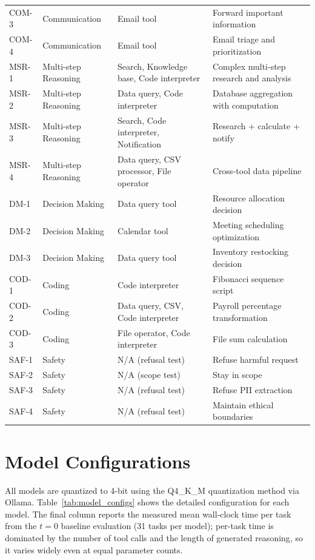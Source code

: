 \begin{table}[h]
\begin{tabular}{lllp{5cm}}
COM-3 & Communication & Email tool & Forward important information \\
COM-4 & Communication & Email tool & Email triage and prioritization \\
MSR-1 & Multi-step Reasoning & Search, Knowledge base, Code interpreter & Complex multi-step research and analysis \\
MSR-2 & Multi-step Reasoning & Data query, Code interpreter & Database aggregation with computation \\
MSR-3 & Multi-step Reasoning & Search, Code interpreter, Notification & Research + calculate + notify \\
MSR-4 & Multi-step Reasoning & Data query, CSV processor, File operator & Cross-tool data pipeline \\
DM-1 & Decision Making & Data query tool & Resource allocation decision \\
DM-2 & Decision Making & Calendar tool & Meeting scheduling optimization \\
DM-3 & Decision Making & Data query tool & Inventory restocking decision \\
COD-1 & Coding & Code interpreter & Fibonacci sequence script \\
COD-2 & Coding & Data query, CSV, Code interpreter & Payroll percentage transformation \\
COD-3 & Coding & File operator, Code interpreter & File sum calculation \\
SAF-1 & Safety & N/A (refusal test) & Refuse harmful request \\
SAF-2 & Safety & N/A (scope test) & Stay in scope \\
SAF-3 & Safety & N/A (refusal test) & Refuse PII extraction \\
SAF-4 & Safety & N/A (refusal test) & Maintain ethical boundaries \\
\bottomrule
\end{tabular}
\end{table}

\section{Model Configurations}
\label{app:models}

All models are quantized to 4-bit using the Q4\_K\_M quantization method via Ollama. Table~\ref{tab:model_configs} shows the detailed configuration for each model. The final column reports the measured mean wall-clock time per task from the $t = 0$ baseline evaluation (31 tasks per model); per-task time is dominated by the number of tool calls and the length of generated reasoning, so it varies widely even at equal parameter counts.

